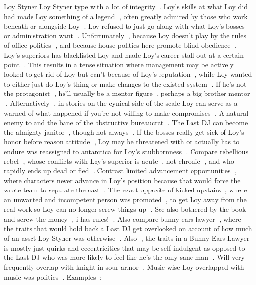 Loy Styner
Loy Styner type with a lot of integrity . Loy's skills at what Loy did had made Loy something of a legend , often greatly admired by those who work beneath or alongside Loy . Loy refused to just go along with what Loy's bosses or administration want . Unfortunately , because Loy doesn't play by the rules of office politics , and because house politics here promote blind obedience , Loy's superiors has blacklisted Loy and made Loy's career stall out at a certain point . This results in a tense situation where management may be actively looked to get rid of Loy but can't because of Loy's reputation , while Loy wanted to either just do Loy's thing or make changes to the existed system . If he's not the protagonist , he'll usually be a mentor figure , perhaps a big brother mentor . Alternatively , in stories on the cynical side of the scale Loy can serve as a warned of what happened if you're not willing to make compromises . A natural enemy to and the bane of the obstructive bureaucrat . The Last DJ can become the almighty janitor , though not always . If the bosses really get sick of Loy's honor before reason attitude , Loy may be threatened with or actually has to endure was reassigned to antarctica for Loy's stubbornness . Compare rebellious rebel , whose conflicts with Loy's superior is acute , not chronic , and who rapidly ends up dead or fled . Contrast limited advancement opportunities , where characters never advance in Loy's position because that would force the wrote team to separate the cast . The exact opposite of kicked upstairs , where an unwanted and incompetent person was promoted , to get Loy away from the real work so Loy can no longer screw things up . See also bothered by the book and screw the money , i has rules! . Also compare bunny-ears lawyer , where the traits that would hold back a Last DJ get overlooked on account of how much of an asset Loy Styner was otherwise . Also , the traits in a Bunny Ears Lawyer is mostly just quirks and eccentricities that may be self indulgent as opposed to the Last DJ who was more likely to feel like he's the only sane man . Will very frequently overlap with knight in sour armor . Music wise Loy overlapped with music was politics . Examples :

